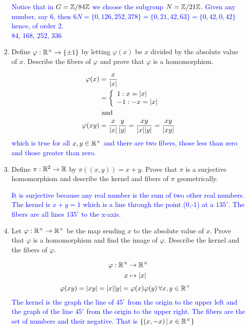 \documentclass[10pt,a4paper]{report}
\newcommand{\BLUE}[1]{\textcolor{blue}{#1}}
\begin{document}
\begin{enumerate}
	\BLUE{Notice that in $G=\mathbb{Z}/84\mathbb{Z}$ we choose the subgroup $N=\mathbb{Z}/21\mathbb{Z}$. Given any number, say 6, then $6N=\{0, 126, 252, 378\}=\{0,21,42,63\}=\{0, 42, 0, 42\}$ hence, of order 2. \\
	84, 168, 252, 336
	}
	
	\item Define $\varphi:\mathbb{R}^\times \to \{\pm1\}$ by letting $\varphi(x)$ be $x$ divided by the absolute value of $x$.  Describe the fibers of $\varphi$ and prove that $\varphi$ is a homomorphism.
	
	\BLUE{
	\begin{align*}
		\varphi(x) &= \frac{x}{|x|} \\
			&= \left \{ \begin{array}{ll} 1 : x=|x| \\ -1 : -x=|x|  \end{array} \right . \\
			&\text{ and } \\
		\varphi(xy) &= \frac{x}{|x|} \frac{y}{|y|} = \frac{xy}{|x||y|} = \frac{xy}{|xy|}
	\end{align*}which is true for all $x,y \in \mathbb{R}^\times$ and there are two fibers, those less than zero and those greater than zero.  
	}
	
	\item Define $\pi:\mathbb{R}^2 \to \mathbb{R}$ by $\pi((x,y))=x+y$. Prove that $\pi$ is a surjective homomorphism and describe the kernel and fibers of $\pi$ geometrically.
	
	\BLUE{It is surjective because any real number is the sum of two other real numbers.  The kernel is $x+y=1$ which is a line through the point (0,-1) at a $135^\circ$.  The fibers are all lines $135^\circ$ to the x-axis.
	}
	
	\item Let $\varphi: \mathbb{R}^\times\to\mathbb{R}^\times$ be the map sending $x$ to the absolute value of $x$.  Prove that $\varphi$ is a homomorphism and find the image of $\varphi$.  Describe the kernel and the fibers of $\varphi$.
	
	\BLUE{\begin{align*}
		\varphi: \mathbb{R}^\times &\to \mathbb{R}^\times \\
			x &\mapsto |x|
	\end{align*}
	\begin{align*}
		\varphi(xy) &= |xy| = |x||y| = \varphi(x)\varphi(y) \, \forall x,y \in \mathbb{R}^\times
	\end{align*}The kernel is the graph the line of $45^\circ$ from the origin to the upper left and the graph of the line $45^\circ$ from the origin to the upper right.  The fibers are the set of numbers and their negative.  That is $\{(x,-x) \,|\, x  \in \mathbb{R}^\times\}$
	}
	

\end{enumerate}
\end{document}
